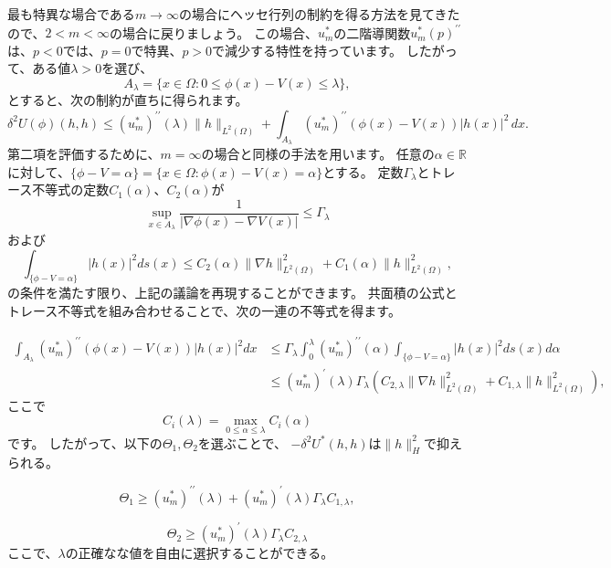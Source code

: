\documentclass{jsarticle}
\theoremstyle{definition}
\begin{document}
最も特異な場合である\(m \to \infty\)の場合にヘッセ行列の制約を得る方法を見てきたので、\(2 < m < \infty\)の場合に戻りましょう。
この場合、\(u^*_m\)の二階導関数\(u^*_m(p)^{\prime\prime}\)は、\(p < 0\)では、\(p = 0\)で特異、\(p > 0\)で減少する特性を持っています。
したがって、ある値\(\lambda > 0\)を選び、
\[
    A_\lambda = \{x \in \Omega : 0 \leq \phi(x) - V(x) \leq \lambda\},
\]
とすると、次の制約が直ちに得られます。
\[
    \delta^2 U(\phi)(h,h) \leq (u^*_m)^{\prime\prime}(\lambda) \|h\|_{L^2(\Omega)} + \int_{A_\lambda} (u^*_m)^{\prime\prime}(\phi(x) - V(x)) |h(x)|^2 \,dx.
\]
第二項を評価するために、\(m = \infty\)の場合と同様の手法を用います。
任意の\(\alpha \in \mathbb{R}\)に対して、\(\{\phi - V = \alpha\} = \{x \in \Omega : \phi(x) - V(x) = \alpha\}\)とする。
定数\(\Gamma_\lambda\)とトレース不等式の定数\(C_1(\alpha)\)、\(C_2(\alpha)\)が
\begin{equation}
    \label{dfn:gamma_lambda}
    \sup_{x \in A_\lambda} \frac{1}{|\nabla \phi(x) - \nabla V(x)|} \leq \Gamma_\lambda
\end{equation}
および
\begin{equation}
    \int_{\{\phi - V = \alpha\}} |h(x)|^2 ds(x) \leq C_2(\alpha) \| \nabla h \|^2_{L^2(\Omega)} + C_1(\alpha) \| h \|^2_{L^2(\Omega)},
\end{equation}
の条件を満たす限り、上記の議論を再現することができます。
共面積の公式とトレース不等式を組み合わせることで、次の一連の不等式を得ます。

\begin{align*}
    \int_{A_\lambda}(u^*_m)^{\prime\prime}(\phi(x) - V(x)) |h(x)|^2 dx  &\leq \Gamma_\lambda \int_{0}^{\lambda} (u^*_m)^{\prime\prime}(\alpha) \int_{\{\phi - V = \alpha\}} |h(x)|^2 ds(x) d\alpha \\
                                                                        &\leq (u^*_m)^\prime (\lambda) \Gamma_\lambda \left( C_{2, \lambda} \| \nabla h \|^2_{L^2(\Omega)} + C_{1, \lambda} \| h \|^2_{L^2(\Omega)}\right),
\end{align*}
ここで
\begin{equation}
    \label{dfn:C_ilambda}
    C_i(\lambda) = \max_{0 \leq \alpha \leq \lambda} C_i(\alpha)
\end{equation}
です。
したがって、以下の$\Theta_1,\Theta_2$を選ぶことで、 \(-\delta^2 U^*(h,h)\)は\(\| h \|^2_H\)で抑えられる。

\[
    \Theta_1 \geq (u^*_m)^{\prime\prime}(\lambda) + (u^*_m)^{\prime}(\lambda) \Gamma_\lambda C_{1, \lambda},
\]

\[
    \Theta_2 \geq (u^*_m)^{\prime}(\lambda) \Gamma_\lambda C_{2, \lambda}
\]
ここで、\(\lambda\)の正確なな値を自由に選択することができる。
\end{document}
